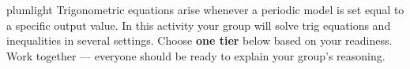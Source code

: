 \documentclass[10pt]{article}
\begin{document}
\namepartnerperiod

\vspace{0.08in}

\begin{scenariobox}{plumlight}
Trigonometric equations arise whenever a periodic model is set equal to
a specific output value. In this activity your group will solve trig
equations and inequalities in several settings. Choose \textbf{one tier}
below based on your readiness. Work together --- everyone should be ready
to explain your group's reasoning.
\end{scenariobox}

\vspace{0.08in}
\end{document}
